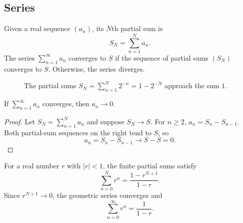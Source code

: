 \subsection{Series}

\begin{definition}
Given a real sequence $(a_n)$, its $N$th partial sum is
\[
 S_N=\sum_{n=1}^{N}a_n.
\]
The series $\sum_{n=1}^{\infty}a_n$ converges to $S$ if the sequence of partial sums $(S_N)$ converges to $S$. Otherwise, the series diverges.
\end{definition}

\begin{figure}[htbp]
\centering
{}
\caption{The partial sums $S_N=\sum_{n=1}^{N}2^{-n}=1-2^{-N}$ approach the sum $1$.}
\label{fig:series-partial-sums}
\end{figure}

\begin{theorem}
If $\sum_{n=1}^{\infty}a_n$ converges, then $a_n\to0$.
\end{theorem}

\begin{proof}
Let $S_N=\sum_{n=1}^{N}a_n$ and suppose $S_N\to S$. For $n\geq2$, $a_n=S_n-S_{n-1}$. Both partial-sum sequences on the right tend to $S$, so
\[
 a_n=S_n-S_{n-1}\longrightarrow S-S=0.
\]
\end{proof}

\begin{example}
For a real number $r$ with $|r|<1$, the finite partial sums satisfy
\[
 \sum_{n=0}^{N}r^n=\frac{1-r^{N+1}}{1-r}.
\]
Since $r^{N+1}\to0$, the geometric series converges and
\[
 \sum_{n=0}^{\infty}r^n=\frac{1}{1-r}.
\]
\end{example}